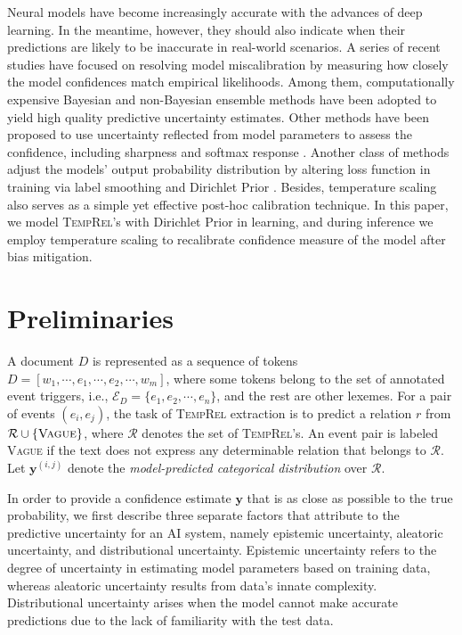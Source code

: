 \documentclass[11pt]{article}
\newcommand{\temprel}{\textsc{TempRel}\xspace}
\newcommand{\yb}{\mathbf{y}}
\newcommand{\stitle}[1]{\vspace{1ex}\noindent{\bf #1}}
\begin{document}
\stitle{Selective Prediction.}
Neural models have become increasingly accurate with the advances of deep learning.
In the meantime, however, they should also indicate when their predictions are likely to be inaccurate in real-world scenarios.
A series of recent studies have focused on resolving model miscalibration by measuring how closely the model confidences match empirical likelihoods.
Among them, computationally expensive Bayesian \cite{gal2016dropout, Kueppers_2021_IV} and non-Bayesian ensemble \cite{NIPS2017_9ef2ed4b, Beluch_2018_CVPR} methods have been adopted to yield high quality predictive uncertainty estimates.
Other methods have been proposed to use uncertainty reflected from model parameters to assess the confidence, including sharpness \cite{kuleshov2018accurate} and softmax response \cite{hendrycks2017baseline,xin-etal-2021-art}.
Another class of methods adjust the models' output probability distribution by altering loss function in training via label smoothing \cite{szegedy2016rethinking} and Dirichlet Prior \cite{malinin2018, malinin2019reverse}.
Besides, temperature scaling \cite{pmlr-v70-guo17a} also serves as a simple yet effective post-hoc calibration technique. 
In this paper, we model \temprel's with Dirichlet Prior in learning, and 
during inference we employ temperature scaling to recalibrate confidence measure of the model after bias mitigation.


\section{Preliminaries}
\label{sec:prelim}
A document $D$ is represented as a sequence of tokens $D = [w_1, \cdots, e_1, \cdots, e_2, \cdots, w_m]$,
where some tokens belong to the set of annotated event triggers, i.e., $\mathcal{E}_D = \{e_1, e_2, \cdots, e_n\}$,
and the rest are other lexemes.
For a pair of events $(e_i, e_j)$, the task of \temprel extraction is to predict a relation $r$ from $\mathcal{R} \cup \{\textsc{Vague}\}$, where $\mathcal{R}$ denotes the set of \temprel's.
An event pair is labeled \textsc{Vague} if the text does not express any determinable relation that belongs to $\mathcal{R}$.
Let $\yb^{(i, j)}$ denote the \emph{model-predicted categorical distribution} over $\mathcal{R}$.


In order to provide a confidence estimate $\yb$ that is as close as possible to the true probability, we first describe three separate factors \cite{malinin2018} that attribute to the predictive uncertainty for an AI system, namely epistemic uncertainty, aleatoric uncertainty, and distributional uncertainty.
Epistemic uncertainty refers to the degree of uncertainty in estimating model parameters based on training data, whereas aleatoric uncertainty results from data's innate complexity. Distributional uncertainty arises when the model cannot make accurate predictions due to the lack of familiarity with the test data.
\end{document}
